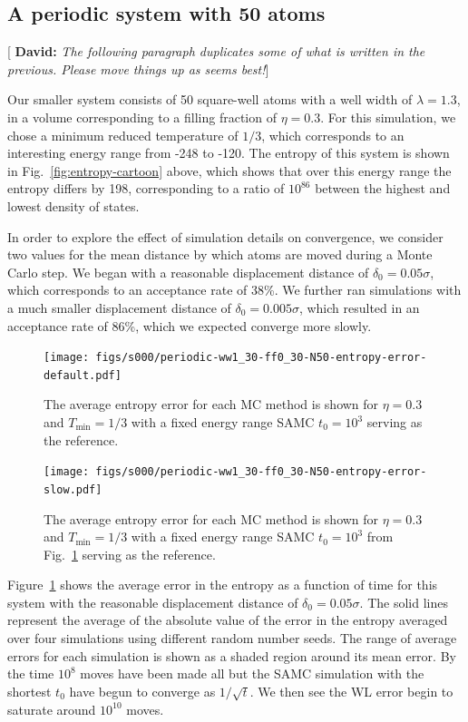 \documentclass[letterpaper,twocolumn,amsmath,amssymb,pre,aps,10pt]{revtex4-1}
\newcommand{\green}[1]{{\bf \color{green} #1}}
\newcommand{\davidsays}[1]{{\color{red} [\green{David:} \emph{#1}]}}
\begin{document}
\subsection{A periodic system with 50 atoms}

\davidsays{The following paragraph duplicates some of what is written
  in the previous.  Please move things up as seems best!}

Our smaller system consists of 50 square-well atoms with a well width
of $\lambda=1.3$, in a volume corresponding to a filling fraction of
$\eta=0.3$.  For this simulation, we chose a minimum reduced
temperature of $1/3$, which corresponds to an interesting energy range
from -248 to -120.  The entropy of this system is shown in
Fig.~\ref{fig:entropy-cartoon} above, which shows that over this
energy range the entropy differs by 198, corresponding to a ratio of
$10^{86}$ between the highest and lowest density of states.

In order to explore the effect of simulation details on convergence,
we consider two values for the mean distance by which atoms are moved
during a Monte Carlo step.  We began with a reasonable displacement
distance of $\delta_0 = 0.05\sigma$, which corresponds to an
acceptance rate of 38\%.  We further ran simulations with a much
smaller displacement distance of $\delta_0 = 0.005\sigma$, which
resulted in an acceptance rate of 86\%, which we expected converge
more slowly.

\begin{figure}
  \texttt{[image: figs/s000/periodic-ww1\_30-ff0\_30-N50-entropy-error-default.pdf]}
  \caption{The average entropy error for each MC method is shown for $\eta = 0.3$ and $T_{\min} = 1/3$ with
  a fixed energy range SAMC $t_0 = 10^3$ serving as the reference.}\label{fig:N50-ff0.3-avg-error}
\end{figure}
\begin{figure}
  \texttt{[image: figs/s000/periodic-ww1\_30-ff0\_30-N50-entropy-error-slow.pdf]}
  \caption{The average entropy error for each MC method is shown for $\eta = 0.3$ and $T_{\min} = 1/3$ with
  a fixed energy range SAMC $t_0 = 10^3$ from Fig.~\ref{fig:N50-ff0.3-avg-error}
  serving as the reference.}\label{fig:N50-ff0.3-avg-error-slow}
\end{figure}

Figure~\ref{fig:N50-ff0.3-avg-error} shows the average error in the
entropy as a function of time for this system with the reasonable
displacement distance of $\delta_0 = 0.05\sigma$.  The solid lines
represent the average of the absolute value of the error in the
entropy averaged over four simulations using different random number
seeds.  The range of average errors for each simulation is shown as a
shaded region around its mean error.  By the time $10^8$ moves have
been made all but the SAMC simulation with the shortest $t_0$ have
begun to converge as $1/\sqrt{t}$.  We then see the WL error begin to
saturate around $10^{10}$ moves.
\end{document}
